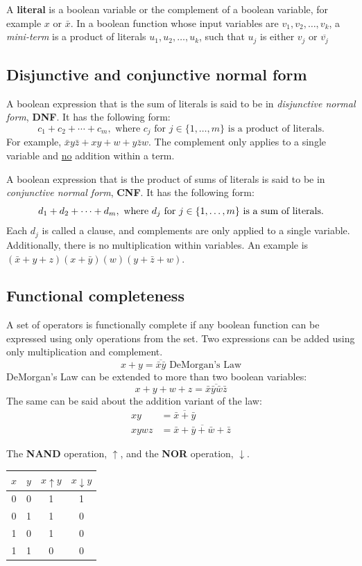 A \textbf{literal} is a boolean variable or the complement of a boolean variable,
for example $x$ or $\bar{x}$. In a boolean function whose input variables are
$v_1, v_2, \ldots, v_k$, a \textit{mini-term} is a product of literals
$u_1, u_2, \ldots, u_k$, such that $u_j$ is either $v_j$ or $\overline{v_j}$

\subsection{Disjunctive and conjunctive normal form}

A boolean expression that is the sum of literals is said to be in \textit{disjunctive normal form},
\textbf{DNF}. It has the following form:
\[
  c_1 + c_2 + \cdots + c_m, \text{ where $c_j$ for $j \in \{1,\ldots,m\}$ is a product of literals.}
\]
For example, $\bar{x}y\bar{z} + xy + w + y\bar{z}w$. The complement only applies to a single variable and
\underline{no} addition within a term.

A boolean expression that is the product of sums of literals is said to be in \textit{conjunctive normal form},
\textbf{CNF}. It has the following form:
\[
  d_1 + d_2 + \cdots + d_m, \text{ where $d_j$ for $j \in \{1,\ldots,m\}$ is a sum of literals.} \\
\]
Each $d_j$ is called a clause, and complements are only applied to a single variable.
Additionally, there is no multiplication within variables.
An example is $(\bar{x} + y + z)(x + \bar{y})(w)(y + \bar{z} + w)$.

\subsection{Functional completeness}

A set of operators is functionally complete if any boolean function can be expressed using only operations from the set.
Two expressions can be added using only multiplication and complement.
\[
  x + y = \overline{\bar{x} \bar{y}} \text{ DeMorgan's Law}
\]
DeMorgan's Law can be extended to more than two boolean variables:
\[
  x + y + w + z = \overline{\bar{x} \bar{y} \bar{w} \bar{z}}
\]
The same can be said about the addition variant of the law:
\begin{align*}
  xy   & = \overline{\bar{x} + \bar{y}}                     \\
  xywz & = \overline{\bar{x} + \bar{y} + \bar{w} + \bar{z}}
\end{align*}

The \textbf{NAND} operation, $\uparrow$, and the \textbf{NOR} operation, $\downarrow$.
\begin{center}
  \begin{tabular}{cc|cc}
    $x$ & $y$ & $x \uparrow y$ & $x \downarrow y$ \\
    \hline
    0   & 0   & 1              & 1                \\
    0   & 1   & 1              & 0                \\
    1   & 0   & 1              & 0                \\
    1   & 1   & 0              & 0
  \end{tabular}
\end{center}

